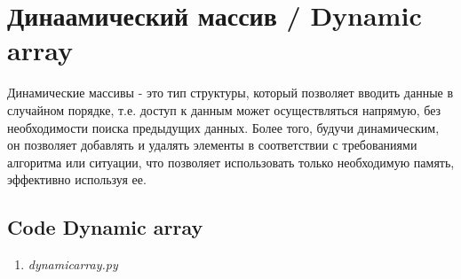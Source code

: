 
\section{Динаамический массив / Dynamic array}

Динамические массивы - это тип структуры, который позволяет вводить данные
в случайном порядке, т.е. доступ к данным может осуществляться напрямую,
без необходимости поиска предыдущих данных. Более того, будучи динамическим,
он позволяет добавлять и удалять элементы в соответствии с требованиями
алгоритма или ситуации, что позволяет использовать только необходимую память,
эффективно используя ее.

\subsection{Code Dynamic array}

\begin{enumerate}

  \item \textit{dynamicarray.py}

  

\end{enumerate}
